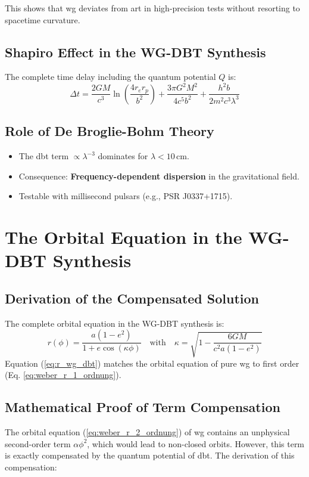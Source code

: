 This shows that \gls{wg} deviates from \gls{art} in high-precision tests without resorting to spacetime curvature.

\subsection{Shapiro Effect in the WG-DBT Synthesis}  
\label{sec:shapiro_dbt}  

The complete time delay including the quantum potential $Q$ is:  
\begin{equation}
    \label{eq:shapiro}
    \boxed
    {
        \Delta t = \frac{2GM}{c^3} \ln\left(\frac{4r_e r_p}{b^2}\right) + \frac{3\pi G^2 M^2}{4c^5 b^2} + \frac{h^2 b}{2m^2 c^3 \lambda^3}  
    }
\end{equation}
\subsection*{Role of De Broglie-Bohm Theory}  
\begin{itemize}  
\item The \gls{dbt} term $\propto \lambda^{-3}$ dominates for $\lambda < 10\,$cm.  
\item Consequence: \textbf{Frequency-dependent dispersion} in the gravitational field.  
\item Testable with millisecond pulsars (e.g., PSR J0337+1715).  
\end{itemize}  

\section{The Orbital Equation in the WG-DBT Synthesis}
\label{sec:bahn_alpha}

\subsection{Derivation of the Compensated Solution}
The complete orbital equation in the WG-DBT synthesis is:
\begin{equation}
    \label{eq:r_wg_dbt}
    r(\phi) = \frac{a(1-e^2)}{1 + e\cos(\kappa\phi)} \quad \text{with} \quad \kappa = \sqrt{1 - \frac{6GM}{c^2a(1-e^2)}}
\end{equation}
Equation (\ref{eq:r_wg_dbt}) matches the orbital equation of pure \gls{wg} to first order (Eq. \ref{eq:weber_r_1_ordnung}).

\subsection{Mathematical Proof of Term Compensation}
\label{sec:bahn_alpha_beweis}
The orbital equation (\ref{eq:weber_r_2_ordnung}) of \gls{wg} contains an unphysical second-order term $\alpha\phi^2$, which would lead to non-closed orbits. However, this term is exactly compensated by the quantum potential of \gls{dbt}. The derivation of this compensation:

